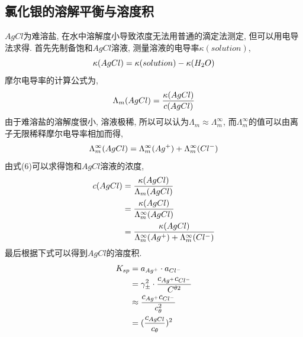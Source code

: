 \documentclass[a4paper]{article}
\begin{document}
\subsection{氯化银的溶解平衡与溶度积}
$AgCl$为难溶盐, 在水中溶解度小导致浓度无法用普通的滴定法测定, 但可以用电导法求得. 
首先先制备饱和$AgCl$溶液, 测量溶液的电导率$\kappa(solution)$,
\begin{equation}
	\kappa(AgCl) = \kappa(solution) - \kappa(H_{2}O)\\
\end{equation}
摩尔电导率的计算公式为,
\begin{equation}
	\Lambda_{m}(AgCl) = \frac{\kappa(AgCl)}{c(AgCl)}\\
\end{equation}
由于难溶盐的溶解度很小, 溶液极稀, 所以可以认为$\Lambda_{m} \approx \Lambda_{m}^{\infty}$, 
而$\Lambda_{m}^{\infty}$的值可以由离子无限稀释摩尔电导率相加而得, 
\begin{equation}
	\Lambda_{m}^{\infty}(AgCl) = 	\Lambda_{m}^{\infty}(Ag^{+}) +	\Lambda_{m}^{\infty}(Cl^{-})\\
\end{equation}
由式(6)可以求得饱和$AgCl$溶液的浓度, 
\begin{equation}
	\centering
	\begin{aligned}
		c(AgCl) &= \frac{\kappa(AgCl)}{\Lambda_{m}(AgCl)}\\
				&=\frac{\kappa(AgCl)}{\Lambda_{m}^{\infty}(AgCl)}\\
				&=\frac{\kappa(AgCl)}{\Lambda_{m}^{\infty}(Ag^{+}) +	\Lambda_{m}^{\infty}(Cl^{-})}\\
	\end{aligned}
\end{equation}
最后根据下式可以得到$AgCl$的溶度积.
\begin{equation}
	\centering
	\begin{aligned}
		K_{sp} &= a_{Ag^{+}} \cdot a_{Cl^{-}}\\
		&= \gamma_{\pm}^{2} \cdot 
		\frac{c_{Ag^{+}} c_{Cl^{-}}}{C^{\theta 2}} \\
		&\approx \frac{c_{Ag^{+}} c_{Cl^{-}}}{c_{\theta}^{2}} \\
		&=(\frac{c_{AgCl}}{c_{\theta}})^{2}\\
	\end{aligned}
\end{equation}
\end{document}
